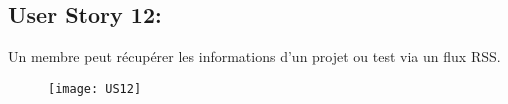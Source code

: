 
\subsection{User Story 12:}
Un membre peut récupérer les informations d'un projet ou test via un flux RSS.

\begin{figure}[!h]
  \begin{center}
        \texttt{[image: US12]}
        \label{US12-dia}
  \end{center}
\end{figure}